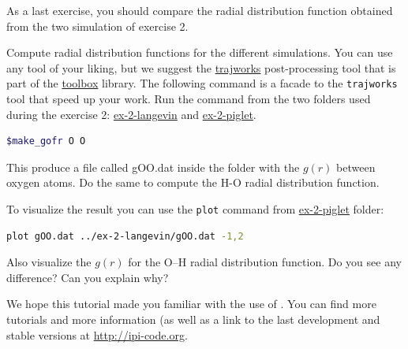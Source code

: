 \documentclass{article}
\begin{document}
\begin{Exercise}[label={inputs},title={Radial distribution function comparison}]
As a last exercise, you should compare the radial distribution
function obtained from the two simulation of exercise 2.

\Question Compute radial distribution functions for the different
simulations. You can use any tool of your liking, but we suggest the
\url{trajworks} post-processing tool that is part of the \url{toolbox}
library.  The following command is a facade to the \texttt{trajworks}
tool that speed up your work. Run the command from the two folders
used during the exercise 2: \url{ex-2-langevin} and \url{ex-2-piglet}.
\begin{lstlisting}[language=bash]
$make_gofr O O
\end{lstlisting}%
This produce a file called gOO.dat inside the folder with the $g(r)$
between oxygen atoms. Do the same to compute  the H-O radial
distribution function.

To visualize the result you can use the \texttt{plot} command from
\url{ex-2-piglet} folder:
\begin{lstlisting}[language=bash]
plot gOO.dat ../ex-2-langevin/gOO.dat -1,2
\end{lstlisting}
Also visualize the $g(r)$ for the O--H radial distribution function.
Do you see any difference? Can you explain why?

\end{Exercise}

We hope this tutorial made you familiar with the use of \ipi. You
can find more tutorials and more information (as well as a link to the
last development and stable versions at \url{http://ipi-code.org}.


%
%
\end{document}
